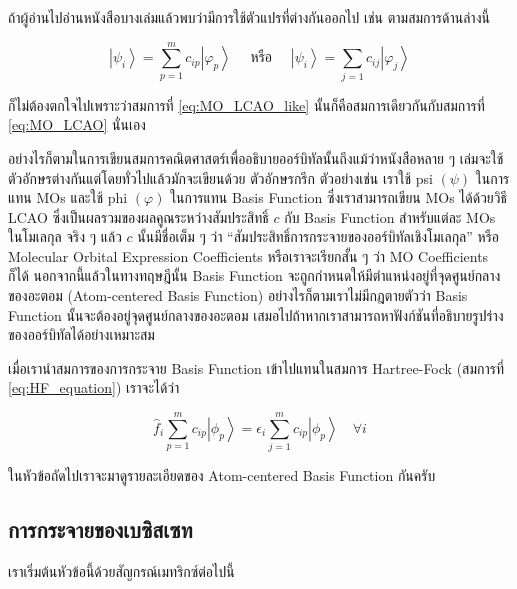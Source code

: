 \noindent ถ้าผู้อ่านไปอ่านหนังสือบางเล่มแล้วพบว่ามีการใช้ตัวแปรที่ต่างกันออกไป เช่น ตามสมการด้านล่างนี้

\begin{equation}
    \label{eq:MO_LCAO_like}
    \left|\psi_{i}\right\rangle
    =
    \sum_{p=1}^m c_{i p}\left|\varphi_{p}\right\rangle
    \quad \text{ หรือ } \quad
    \left|\psi_{i}\right\rangle
    =
    \sum_{j=1} c_{i j}\left|\varphi_{j}\right\rangle
\end{equation}

\noindent ก็ไม่ต้องตกใจไปเพราะว่าสมการที่ \eqref{eq:MO_LCAO_like} นั้นก็คือสมการเดียวกันกับสมการที่ \eqref{eq:MO_LCAO} นั่นเอง

อย่างไรก็ตามในการเขียนสมการคณิตศาสตร์เพื่ออธิบายออร์บิทัลนั้นถึงแม้ว่าหนังสือหลาย ๆ เล่มจะใช้ตัวอักษรต่างกันแต่โดยทั่วไปแล้วมักจะเขียนด้วย%
ตัวอักษรกรีก ตัวอย่างเช่น เราใช้ psi $(\psi)$ ในการแทน MOs และใช้ phi $(\varphi)$ ในการแทน Basis Function ซึ่งเราสามารถเขียน
MOs ได้ด้วยวิธี LCAO ซึ่งเป็นผลรวมของผลคูณระหว่างสัมประสิทธิ์ $c$ กับ Basis Function สำหรับแต่ละ MOs ในโมเลกุล จริง ๆ แล้ว $c$
นั้นมีชื่อเต็ม ๆ ว่า \enquote{สัมประสิทธิ์การกระจายของออร์บิทัลเชิงโมเลกุล} หรือ Molecular Orbital Expression Coefficients
หรือเราจะเรียกสั้น ๆ ว่า MO Coefficients ก็ได้ นอกจากนี้แล้วในทางทฤษฎีนั้น Basis Function จะถูกกำหนดให้มีตำแหน่งอยู่ที่จุดศูนย์กลาง%
ของอะตอม (Atom-centered Basis Function) อย่างไรก็ตามเราไม่มีกฎตายตัวว่า Basis Function นั้นจะต้องอยู่จุดศูนย์กลางของอะตอม%
เสมอไปถ้าหากเราสามารถหาฟังก์ชันที่อธิบายรูปร่างของออร์บิทัลได้อย่างเหมาะสม

เมื่อเรานำสมการของการกระจาย Basis Function เข้าไปแทนในสมการ Hartree-Fock (สมการที่ \eqref{eq:HF_equation}) เราจะได้ว่า

\begin{equation}
    \label{eq:HF_equation_LCMO}
    \hat{f}_i \sum_{p=1}^m c_{i p}\left|\phi_p\right\rangle
    =
    \epsilon_i \sum_{j=1}^m c_{i p}\left|\phi_p\right\rangle \quad \forall i
\end{equation}

ในหัวข้อถัดไปเราจะมาดูรายละเอียดของ Atom-centered Basis Function กันครับ

\subsection{การกระจายของเบซิสเซท}

เราเริ่มต้นหัวข้อนี้ด้วยสัญกรณ์เมทริกซ์ต่อไปนี้

